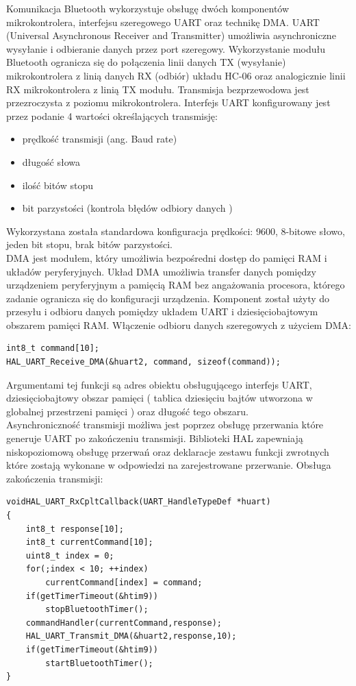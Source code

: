 \documentclass[eng,printmode]{mgr}
\begin{document}
Komunikacja Bluetooth wykorzystuje obsługę dwóch komponentów mikrokontrolera, interfejsu szeregowego UART oraz technikę DMA. UART (Universal Asynchronous Receiver and Transmitter) umożliwia asynchroniczne wysyłanie i odbieranie danych przez port szeregowy. Wykorzystanie modułu Bluetooth ogranicza się do połączenia linii danych  TX (wysyłanie) mikrokontrolera z linią danych RX (odbiór) układu HC-06 oraz analogicznie linii RX mikrokontrolera z linią TX modułu. Transmisja bezprzewodowa jest przezroczysta z poziomu mikrokontrolera. Interfejs UART konfigurowany jest przez podanie 4 wartości określających transmisję:
\begin{itemize}
  \item prędkość transmisji (ang. Baud rate)
  \item długość słowa
  \item ilość bitów stopu
  \item bit parzystości (kontrola błędów odbiory danych )
\end{itemize}
Wykorzystana została standardowa konfiguracja prędkości: 9600, 8-bitowe słowo, jeden bit stopu, brak bitów parzystości.
\\DMA jest modułem, który umożliwia bezpośredni dostęp do pamięci RAM i układów peryferyjnych. Układ DMA umożliwia transfer danych pomiędzy urządzeniem peryferyjnym a pamięcią RAM bez angażowania procesora, którego zadanie ogranicza się do konfiguracji urządzenia. Komponent został użyty do przesyłu i odbioru danych pomiędzy układem UART i dziesięciobajtowym obszarem pamięci RAM. Włączenie odbioru danych szeregowych z użyciem DMA:
\begin{lstlisting}[style=c]
int8_t command[10];
HAL_UART_Receive_DMA(&huart2, command, sizeof(command));
\end{lstlisting}
Argumentami tej funkcji są adres obiektu obsługującego interfejs UART, dziesięciobajtowy obszar pamięci ( tablica dziesięciu bajtów utworzona w globalnej przestrzeni pamięci ) oraz długość tego obszaru. 
\\Asynchroniczność transmisji możliwa jest poprzez obsługę przerwania które generuje UART po zakończeniu transmisji. Biblioteki HAL zapewniają niskopoziomową obsługę przerwań oraz deklaracje zestawu funkcji zwrotnych które zostają wykonane w odpowiedzi na zarejestrowane przerwanie. Obsługa zakończenia transmisji:
\begin{lstlisting}[style=c]
voidHAL_UART_RxCpltCallback(UART_HandleTypeDef *huart)
{
	int8_t response[10];
	int8_t currentCommand[10];
	uint8_t index = 0;
	for(;index < 10; ++index)
		currentCommand[index] = command;
	if(getTimerTimeout(&htim9))
		stopBluetoothTimer();
	commandHandler(currentCommand,response);
	HAL_UART_Transmit_DMA(&huart2,response,10);
	if(getTimerTimeout(&htim9))
		startBluetoothTimer();
}
\end{lstlisting}
\end{document}
